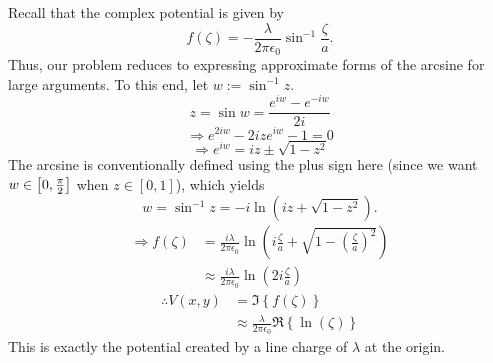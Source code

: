 \item

Recall that the complex potential is given by
\[
    f(\zeta) = -\frac{\lambda}{2\pi\epsilon_0} \sin^{-1} \frac{\zeta}{a}.
\]
Thus, our problem reduces to expressing approximate forms of the arcsine for large arguments.
To this end, let $w := \sin^{-1} z$.
\[
    z = \sin w = \frac{e^{iw} - e^{-iw}}{2i}
\]
\[
    \Rightarrow e^{2iw} - 2ize^{iw} - 1 = 0
\]
\[
    \Rightarrow e^{iw} = iz \pm \sqrt{1 - z^2}
\]
The arcsine is conventionally defined using the plus sign here
(since we want $w \in \left[ 0, \frac{\pi}{2} \right]$ when $z \in [0, 1]$),
which yields
\[
    w = \sin^{-1} z = -i\ln\left( iz + \sqrt{1 - z^2} \right).
\]
\begin{align*}
    \Rightarrow f(\zeta)
    &= \frac{i\lambda}{2\pi\epsilon_0} \ln\left(
        i\frac{\zeta}{a} + \sqrt{1 - {\left( \frac{\zeta}{a} \right)}^2}
    \right) \\
    &\approx \frac{i\lambda}{2\pi\epsilon_0} \ln\left( 2i\frac{\zeta}{a} \right)
\end{align*}
\begin{align*}
    \therefore V(x, y)
    &= \Im\left\{ f(\zeta) \right\} \\
    &\approx \frac{\lambda}{2\pi\epsilon_0} \Re\left\{ \ln\left( \zeta \right) \right\}
\end{align*}
This is exactly the potential created by a line charge of $\lambda$ at the origin.
